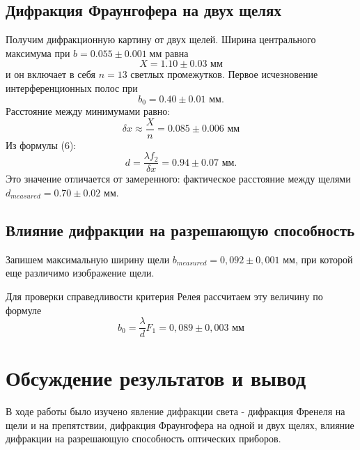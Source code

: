 \documentclass{article}
\begin{document}
\subsection{Дифракция Фраунгофера на двух щелях}
Получим дифракционную картину от двух щелей. Ширина центрального максимума при $ b=0.055\pm 0.001\; мм $ равна
\begin{equation*}\label{key}
	X = 1.10\pm 0.03 \text{ мм}
\end{equation*}
и он включает в себя $ n = 13 $ светлых промежутков.
Первое исчезновение интерференционных полос при
\begin{equation*}\label{key}
	b_0 = 0.40 \pm 0.01 \text{ мм}.
\end{equation*}
Расстояние между минимумами равно:
\begin{equation*}\label{key}
	\delta x \approx \frac{X}{n} = 0.085\pm 0.006 \text{ мм}
\end{equation*}
Из формулы (6):
\begin{equation*}\label{key}
	d = \frac{\lambda f_2}{\delta x} = 0.94\pm 0.07 \text{ мм}.
\end{equation*}
Это значение отличается от замеренного: фактическое расстояние между щелями $ d_{measured} = 0.70\pm 0.02\text{ мм} $. 
\subsection{Влияние дифракции на разрешающую способность}
	
	Запишем максимальную ширину щели $b_{measured} = 0,092\pm 0,001$ мм, при которой еще различимо изображение щели.
	
	Для проверки справедливости критерия Релея рассчитаем эту величину по формуле
	\[
		b_0 = \frac{\lambda}{d}F_1 = 0,089\pm 0,003 \text{ мм}
	\]
	\section{Обсуждение результатов и вывод}

 В ходе работы было изучено явление дифракции света - дифракция Френеля на щели и на препятствии, дифракция Фраунгофера на одной и двух щелях, влияние дифракции на разрешающую способность оптических приборов.
\end{document}
